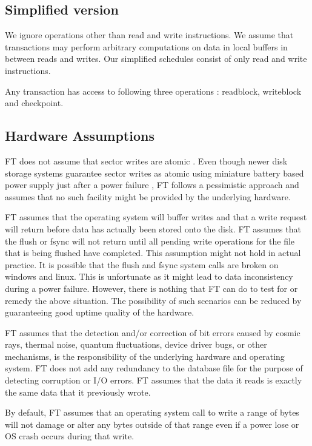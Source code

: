 \documentclass[11pt,a4paper]{article}
\begin{document}
\subsection{Simplified version}

We ignore operations other than read and write instructions. We assume that transactions may perform arbitrary computations on data in local buffers in between reads and writes. Our simplified schedules consist of only read and write instructions.

Any transaction has access to following three operations : readblock, writeblock and checkpoint.



\subsection{Hardware Assumptions} FT does not assume that sector writes are atomic . Even though newer disk storage systems guarantee sector writes as atomic using miniature battery based power supply just after a power failure , FT follows a pessimistic approach and assumes that no such facility might be provided by the underlying hardware.

FT assumes that the operating system will buffer writes and that a write request will return before data has actually been stored onto the disk. FT assumes that the flush or fsync will not return until all pending write operations for the file that is being flushed have completed. This assumption might not hold in actual practice. It is possible that the flush and fsync system calls are broken on windows and linux. This is unfortunate as it might lead to data inconsistency during a power failure. However, there is nothing that FT can do to test for or remedy the above situation. The possibility of such scenarios can be reduced by guaranteeing good uptime quality of the hardware.

FT assumes that the detection and/or correction of bit errors caused by cosmic rays, thermal noise, quantum fluctuations, device driver bugs, or other mechanisms, is the responsibility of the underlying hardware and operating system. FT does not add any redundancy to the database file for the purpose of detecting corruption or I/O errors. FT assumes that the data it reads is exactly the same data that it previously wrote.

By default, FT assumes that an operating system call to write a range of bytes will not damage or alter any bytes outside of that range even if a power lose or OS crash occurs during that write. 
\end{document}
